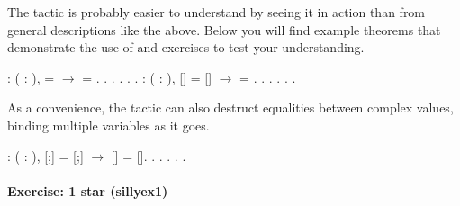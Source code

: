 \documentclass[12pt]{report}
\begin{document}
 The  tactic is probably easier to understand by
    seeing it in action than from general descriptions like the above.
    Below you will find example theorems that demonstrate the use of
     and exercises to test your understanding. \begin{coqdoccode}
\coqdocemptyline
\coqdocnoindent
{}  : \coqdockw{\ensuremath{\forall}} (  : ),\coqdoceol
\coqdocindent{2.50em}
  =   \ensuremath{\rightarrow}\coqdoceol
\coqdocindent{2.50em}
 = .\coqdoceol
\coqdocnoindent
{}.\coqdoceol
\coqdocindent{1.00em}
   .  . . .\coqdoceol
\coqdocemptyline
\coqdocnoindent
{}  : \coqdockw{\ensuremath{\forall}} (  : ),\coqdoceol
\coqdocindent{2.50em}
[] = [] \ensuremath{\rightarrow}\coqdoceol
\coqdocindent{2.50em}
 = .\coqdoceol
\coqdocnoindent
{}.\coqdoceol
\coqdocindent{1.00em}
   .  . . .\coqdoceol
\coqdocemptyline
\end{coqdoccode}
As a convenience, the  tactic can also
    destruct equalities between complex values, binding
    multiple variables as it goes. \begin{coqdoccode}
\coqdocemptyline
\coqdocnoindent
{}  : \coqdockw{\ensuremath{\forall}} (   : ),\coqdoceol
\coqdocindent{2.50em}
[;] = [;] \ensuremath{\rightarrow}\coqdoceol
\coqdocindent{2.50em}
[] = [].\coqdoceol
\coqdocnoindent
{}.\coqdoceol
\coqdocindent{1.00em}
    .  . . .\coqdoceol
\coqdocemptyline
\end{coqdoccode}
\paragraph{Exercise: 1 star (sillyex1)}
\end{document}
